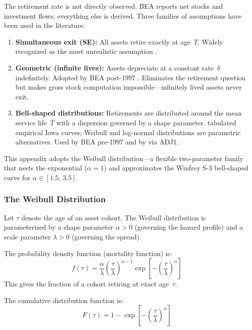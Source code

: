 The retirement rate is not directly observed. BEA reports net stocks and
investment flows; everything else is derived. Three families of assumptions have
been used in the literature:
%
\begin{enumerate}
    \item \textbf{Simultaneous exit (SE):} All assets retire exactly at
    age~$T$. Widely recognized as the most unrealistic assumption
    \citep{Blades2001, Nomura2005}.

    \item \textbf{Geometric (infinite lives):} Assets depreciate at a constant
    rate~$\delta$ indefinitely. Adopted by BEA post-1997
    \citep{Fraumeni1997}. Eliminates the retirement question but makes gross
    stock computation impossible---infinitely lived assets never exit.

    \item \textbf{Bell-shaped distributions:} Retirements are distributed around
    the mean service life~$\bar{T}$ with a dispersion governed by a shape
    parameter. \citet{Winfrey1967} tabulated empirical Iowa curves; Weibull and
    log-normal distributions are parametric alternatives. Used by BEA pre-1997
    and by \citet[Appendix~6.7]{Shaikh2016} via ADJ1.
\end{enumerate}

This appendix adopts the Weibull distribution---a flexible two-parameter family
that nests the exponential ($\alpha = 1$) and approximates the Winfrey S-3
bell-shaped curve for $\alpha \in [1.5,\, 3.5]$.


\subsubsection{The Weibull Distribution}
\label{app:ret:weibull_def}

Let $\tau$ denote the age of an asset cohort. The Weibull distribution is
parameterized by a shape parameter $\alpha > 0$ (governing the hazard profile)
and a scale parameter $\lambda > 0$ (governing the spread).

The probability density function (mortality function) is:
%
\begin{equation}
    f(\tau) = \frac{\alpha}{\lambda}
    \left(\frac{\tau}{\lambda}\right)^{\alpha - 1}
    \exp\!\left[-\left(\frac{\tau}{\lambda}\right)^{\!\alpha}\right]
    \label{eq:ret:pdf}
\end{equation}
%
This gives the fraction of a cohort retiring at exact age~$\tau$.

The cumulative distribution function is:
%
\begin{equation}
    F(\tau) = 1 - \exp\!\left[-\left(\frac{\tau}{\lambda}\right)^{\!\alpha}\right]
    \label{eq:ret:cdf}
\end{equation}


